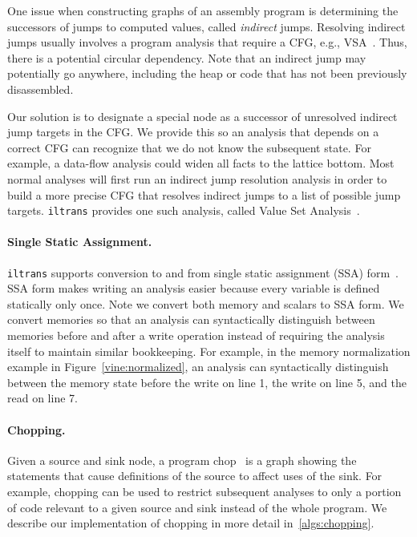 One issue when constructing  graphs of an assembly program is
determining the successors of jumps to computed values, called {\it
  indirect} jumps.  Resolving indirect jumps usually involves a program
analysis that require a CFG, e.g., VSA~\cite{balakrishnan:2007}. Thus,
there is a potential circular dependency.  Note that an indirect jump
may potentially go anywhere, including the heap or code that has not
been previously disassembled.

Our solution is to designate a special node as a successor of
unresolved indirect jump targets in the CFG.  We provide this so an
analysis that depends on a correct CFG can recognize that we do not
know the subsequent state. For example, a data-flow analysis could
widen all facts to the lattice bottom.  Most normal analyses will
first run an indirect jump resolution analysis in order to build a
more precise CFG that resolves indirect jumps to a list of possible
jump targets.  {\tt iltrans} provides one such analysis, called Value Set
Analysis~\cite{balakrishnan:2007}.

\paragraph{Single Static Assignment.} {\tt iltrans} supports
conversion to and from single static assignment (SSA)
form~\cite{muchnick:1997}. SSA form makes writing an analysis easier
because every variable is defined statically only once.  Note we
convert both memory and scalars to SSA form. We convert memories so
that an analysis can syntactically distinguish between memories before
and after a write operation instead of requiring the analysis itself
to maintain similar bookkeeping. For example, in the memory
normalization example in Figure~\ref{vine:normalized}, an analysis can
syntactically distinguish between the memory state before the write on
line 1, the write on line 5, and the read on line 7.

\paragraph{Chopping.}  Given a source and sink node, a program
chop~\cite{jackson:1994} is a graph showing the statements that cause
definitions of the source to affect uses of the sink.  For example,
chopping can be used to restrict subsequent analyses to only a portion
of code relevant to a given source and sink instead of the whole
program. We describe our implementation of chopping in more detail
in~\ref{algs:chopping}.

